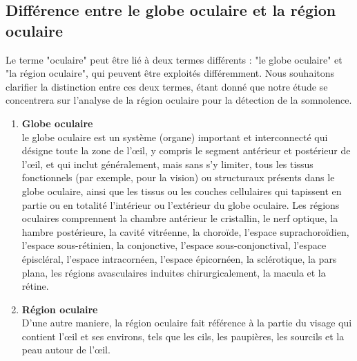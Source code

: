 \subsection{Différence entre le globe oculaire et la région oculaire}
Le terme "oculaire" peut être lié à deux termes différents : "le globe oculaire" et "la région oculaire", qui peuvent être exploités différemment. Nous souhaitons clarifier la distinction entre ces deux termes, étant donné que notre étude se concentrera sur l'analyse de la région oculaire pour la détection de la somnolence.
\begin{enumerate}
    \item \textbf{Globe oculaire}\\
    le globe oculaire est un système (organe) important et interconnecté qui désigne toute la zone de l'œil, y compris le segment antérieur et postérieur de l'œil, et qui inclut généralement, mais sans s'y limiter, tous les tissus fonctionnels (par exemple, pour la vision) ou structuraux présents dans le globe oculaire, ainsi que les tissus ou les couches cellulaires qui tapissent en partie ou en totalité l'intérieur ou l'extérieur du globe oculaire. Les régions oculaires comprennent la chambre antérieur le cristallin, le nerf optique, la hambre postérieure, la cavité vitréenne, la choroïde, l'espace suprachoroïdien, l'espace sous-rétinien, la conjonctive, l'espace sous-conjonctival, l'espace épiscléral, l'espace intracornéen, l'espace épicornéen, la sclérotique, la pars plana, les régions avasculaires induites chirurgicalement, la macula et la rétine\cite{fedorchak2019thermoresponsive}. 
    \item \textbf{Région oculaire}\\
    D'une autre maniere, la région oculaire fait référence à la partie du visage qui contient l’œil et ses environs, tels que les cils, les paupières, les sourcils et la peau autour de l’œil\cite{Vizoni2020OcularRU}. 
\end{enumerate}



